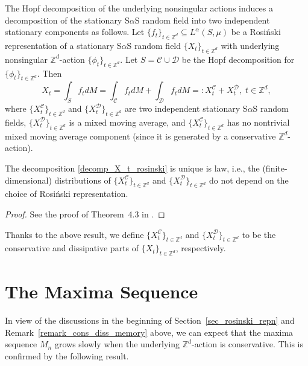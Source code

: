 \documentclass[12pt]{amsart}
\begin{document}
The Hopf decomposition of the underlying nonsingular actions induces a decomposition of the stationary S$\alpha$S random field into two independent stationary components as follows. Let $\{f_t\}_{t \in {\mathbb{Z}^d}} \subseteq L^\alpha(S, \mu)$ be a Rosi\'{n}ski representation of a stationary S$\alpha$S random field ${\{X_t\}_{t \in \mathbb{Z}^d}}$ with underlying nonsingular ${\mathbb{Z}^d}$-action ${\{\phi_t\}_{t \in \mathbb{Z}^d}}$. Let $S = \mathcal{C}\cup \mathcal{D}$ be the Hopf decomposition for ${\{\phi_t\}_{t \in \mathbb{Z}^d}}$. Then
\begin{equation}
X_t = \int_S f_t dM =  \int_\mathcal{C} f_t dM +  \int_\mathcal{D} f_t dM =:X^\mathcal{C}_t + X^\mathcal{D}_t, \;t \in {\mathbb{Z}^d}, \label{decomp_X_t_rosinski}
\end{equation}
where $\{X^\mathcal{C}_t\}_{t \in {\mathbb{Z}^d}}$ and $\{X^\mathcal{D}_t\}_{t \in {\mathbb{Z}^d}}$ are two independent stationary S$\alpha$S random fields, $\{X^\mathcal{D}_t\}_{t \in {\mathbb{Z}^d}}$ is a mixed moving average, and $\{X^\mathcal{C}_t\}_{t \in {\mathbb{Z}^d}}$ has no nontrivial mixed moving average component (since it is generated by a conservative ${\mathbb{Z}^d}$-action).

\begin{thm} The decomposition \eqref{decomp_X_t_rosinski} is unique is law, i.e., the (finite-dimensional) distributions of $\{X^\mathcal{C}_t\}_{t \in {\mathbb{Z}^d}}$ and $\{X^\mathcal{D}_t\}_{t \in {\mathbb{Z}^d}}$ do not depend on the choice of Rosi\'{n}ski representation.
\end{thm}

\begin{proof} See the proof of Theorem~4.3 in \cite{rosinski:1995}.
\end{proof}

Thanks to the above result, we define $\{X^\mathcal{C}_t\}_{t \in {\mathbb{Z}^d}}$ and $\{X^\mathcal{D}_t\}_{t \in {\mathbb{Z}^d}}$ to be the conservative and dissipative parts of ${\{X_t\}_{t \in \mathbb{Z}^d}}$, respectively.

\section{The Maxima Sequence} \label{sec:maxima}

In view of the discussions in the beginning of Section~\ref{sec_rosinski_repn} and Remark~\ref{remark_cons_diss_memory} above, we can expect that the maxima sequence $M_n$ grows slowly when the underlying ${\mathbb{Z}^d}$-action is conservative. This is confirmed by the following result.
\end{document}
